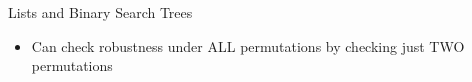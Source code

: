 \documentclass[usenames,dvipsnames]{beamer}
\newcommand{\e}{\emptyset}
\begin{document}
\begin{frame}[fragile]{Lists and Binary Search Trees}
  \begin{itemize}
    \item Can check robustness under ALL permutations
      by checking just TWO permutations
  \end{itemize}
\end{frame}

% 
\end{document}
